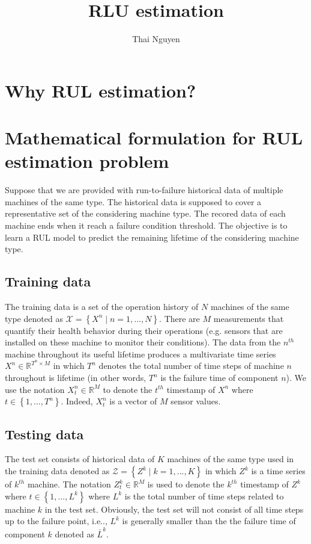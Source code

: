 \documentclass{article}
\title{\vspace{-40pt}\Large RLU estimation}
\author{\normalsize Thai Nguyen}
\DeclareRobustCommand{\&}{%
	\ifdim\fontdimen1\font>0pt
	\textsl{\symbol{`\&}}%
	\else
	\symbol{`\&}%
	\fi
}
\begin{document}
\maketitle

\section{Why RUL estimation?}
\section{Mathematical formulation for RUL estimation problem}
Suppose that we are provided with run-to-failure historical data of multiple machines of the same type. The historical data is supposed to cover a representative set of the considering machine type. The recored data of each machine ends when it reach a failure condition threshold. The objective is to learn a RUL model to predict the remaining lifetime of the considering machine type.

\subsection{Training data}
The training data is a set of the operation history of $N$ machines of the same type denoted as $\mathcal{X} = \left\lbrace X^n \mid n=1, ..., N \right\rbrace$. There are $M$ measurements that quantify their health behavior during their operations (e.g. sensors that are installed on these machine to monitor their conditions). The data from the $n^{th}$ machine throughout its useful lifetime produces a multivariate time series $X^n \in \mathbb{R}^{T^n \times M}$ in which $T^n$ denotes the total number of time steps of machine $n$ throughout is lifetime (in other words, $T^n$ is the failure time of component $n$). We use the notation $X_t^n \in \mathbb{R}^M$ to denote the $t^{th}$ timestamp of $X^n$ where $t \in \left\lbrace 1, ..., T^n \right\rbrace$. Indeed, $X_t^n$ is a vector of $M$ sensor values.

\subsection{Testing data}
The test set consists of historical data of $K$ machines of the same type used in the training data denoted as $\mathcal{Z}= \left\lbrace Z^k \mid k=1, ..., K \right\rbrace$ in which $Z^k$ is a time series of $k^{th}$ machine. The notation $Z_t^k \in \mathbb{R}^M$ is used to denote the $k^{th}$ timestamp of $Z^k$ where $t \in \left\lbrace 1, ..., L^k \right\rbrace$ where $L^k$ is the total number of time steps related to machine $k$ in the test set. Obviously, the test set will not consist of all time steps up to the failure point, i.e.., $L^k$ is generally smaller than the the failure time of component $k$ denoted as $\bar{L}^k$.
\end{document}
